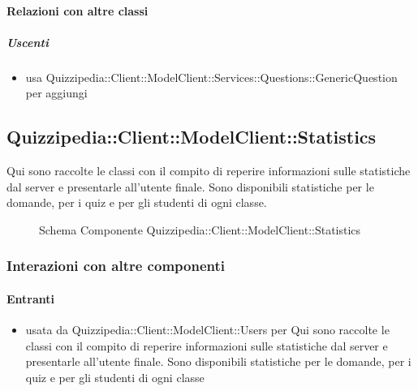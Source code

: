 \paragraph{Relazioni con altre classi}
\subparagraph{Uscenti}
\begin{itemize}
\item usa Quizzipedia::Client::ModelClient::Services::Questions::GenericQuestion per aggiungi
\end{itemize}
\subsection{Quizzipedia::Client::ModelClient::Statistics}
Qui sono raccolte le classi con il compito di reperire informazioni sulle statistiche dal server e presentarle all'utente finale. Sono disponibili statistiche per le domande, per i quiz e per gli studenti di ogni classe.
\begin{figure}[H]
\centering
\noindent{}
\caption[Schema Componente Quizzipedia::Client::ModelClient::Statistics]{Schema Componente Quizzipedia::Client::ModelClient::Statistics}
\end{figure}
\subsubsection{Interazioni con altre componenti}
\paragraph{Entranti}
\begin{itemize}
\item usata da Quizzipedia::Client::ModelClient::Users per Qui sono raccolte le classi con il compito di reperire informazioni sulle statistiche dal server e presentarle all'utente finale. Sono disponibili statistiche per le domande, per i quiz e per gli studenti di ogni classe
\end{itemize}
